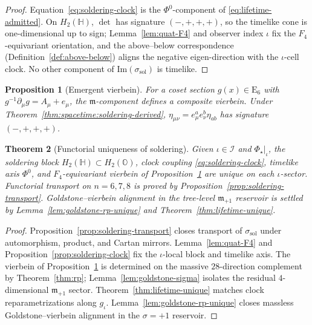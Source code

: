 \documentclass[11pt]{article}
\theoremstyle{plain}
\newtheorem{theorem}{Theorem}[section]
\newtheorem{proposition}[theorem]{Proposition}
\theoremstyle{definition}
\theoremstyle{remark}
\numberwithin{equation}{section}
\newcommand{\Quat}{\mathbb{H}}
\newcommand{\Oct}{\mathbb{O}}
\newcommand{\E}[1]{\mathrm{E}_{#1}}
\newcommand{\orderparam}{\Phi}
\begin{document}
\begin{proof}
Equation~\eqref{eq:soldering-clock} is the $\orderparam^0$-component of
\eqref{eq:lifetime-admitted}. On $H_2(\Quat)$, $\det$ has signature
$(-,+,+,+)$, so the timelike cone is one-dimensional up to sign;
Lemma~\ref{lem:quat-F4} and observer index $\iota$ fix the
$F_4$-equivariant orientation, and the above--below correspondence
(Definition~\ref{def:above-below}) aligns the negative eigen-direction
with the $\iota$-cell clock. No other component of
$\mathrm{Im}(\sigma_{\mathrm{sol}})$ is timelike.
\end{proof}

\begin{proposition}[Emergent vierbein]\label{prop:vierbein}
For a coset section $g(x)\in\E{6}$ with $g^{-1}\partial_\mu g=A_\mu+e_\mu$,
the $\mathfrak{m}$-component defines a composite vierbein. Under
Theorem~\ref{thm:spacetime:soldering-derived},
$\eta_{\mu\nu}=e^a_\mu e^b_\nu\eta_{ab}$ has signature $(-,+,+,+)$.
\end{proposition}

\begin{theorem}[Functorial uniqueness of soldering]
\label{thm:soldering-unique}
Given $\iota\in\mathcal{I}$ and $\orderparam_\star|_\iota$, the soldering
block $H_2(\Quat)\subset H_2(\Oct)$, clock coupling
\eqref{eq:soldering-clock}, timelike axis $\orderparam^0$, and
$F_4$-equivariant vierbein of Proposition~\ref{prop:vierbein} are unique on
each $\iota$-sector. Functorial transport on $n=6,7,8$ is proved by
Proposition~\ref{prop:soldering-transport}. Goldstone--vierbein alignment in
the tree-level $\mathfrak{m}_{+1}$ reservoir is settled by
Lemma~\ref{lem:goldstone-rp-unique} and
Theorem~\ref{thm:lifetime-unique}.
\end{theorem}

\begin{proof}
Proposition~\ref{prop:soldering-transport} closes transport of
$\sigma_{\mathrm{sol}}$ under automorphism, product, and Cartan mirrors.
Lemma~\ref{lem:quat-F4} and Proposition~\ref{prop:soldering-clock} fix the
$\iota$-local block and timelike axis. The vierbein of
Proposition~\ref{prop:vierbein} is determined on the massive $28$-direction
complement by Theorem~\ref{thm:rp}; Lemma~\ref{lem:goldstone-sigma}
isolates the residual $4$-dimensional $\mathfrak{m}_{+1}$ sector.
Theorem~\ref{thm:lifetime-unique} matches clock reparametrizations along
$g_\iota$. Lemma~\ref{lem:goldstone-rp-unique} closes massless
Goldstone--vierbein alignment in the $\sigma=+1$ reservoir.
\end{proof}
\end{document}
